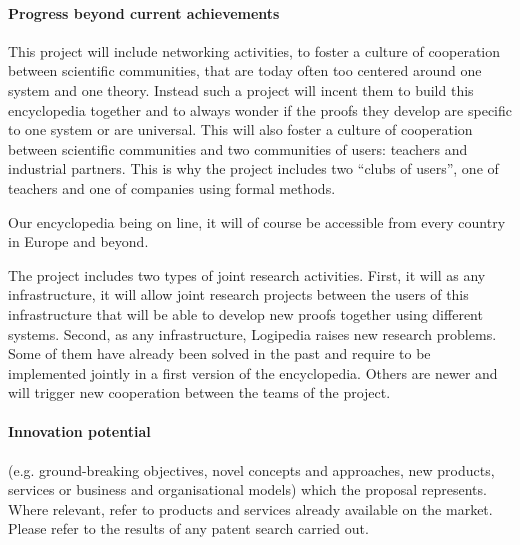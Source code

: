\paragraph{Progress beyond current achievements}

This project will include networking activities, to foster a culture
of cooperation between scientific communities, that are today often
too centered around one system and one theory. Instead such a project
will incent them to build this encyclopedia together and to always
wonder if the proofs they develop are specific to one system or are
universal. This will also foster a culture of cooperation between
scientific communities and two communities of users: teachers and
industrial partners. This is why the project includes two ``clubs of
users'', one of teachers and one of companies using formal methods.

Our encyclopedia being on line, it will of course be accessible from
every country in Europe and beyond.

The project includes two types of joint research activities.  First,
it will as any infrastructure, it will allow joint research projects
between the users of this infrastructure that will be able to develop
new proofs together using different systems. Second, as any
infrastructure, {\sc Logipedia} raises new research problems. Some of
them have already been solved in the past and require to be
implemented jointly in a first version of the encyclopedia. Others are
newer and will trigger new cooperation between the teams of the project.

\paragraph{Innovation potential}


(e.g. ground-breaking objectives,
novel concepts and approaches, new products, services or business and
organisational models) which the proposal represents. Where relevant,
refer to products and services already available on the market. Please
refer to the results of any patent search carried out.









